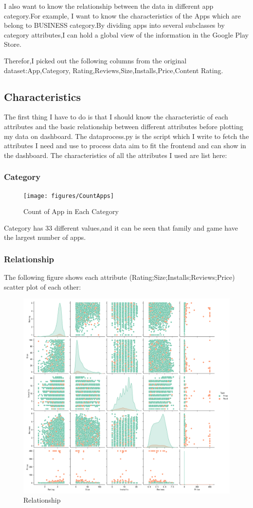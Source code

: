 \documentclass{hci}
\begin{document}
I also want to know the relationship between the data in different app category.For example, I want to know the
characteristics of the Apps which are belong to BUSINESS category.By dividing apps into several subclasses by category attributes,I can hold a global view of the information in the Google Play Store.

Therefor,I picked out the following columns from the original dataset:App,Category,
Rating,Reviews,Size,Installs,Price,Content Rating.

\subsection{Characteristics}
The first thing I have to do is that I should know the characteristic of each attributes and the basic relationship
between different attributes before plotting my data on dashboard.
The dataprocess.py is the script which I write to fetch the attributes I need and use to process data aim to fit the frontend and can show in the dashboard. 
The characteristics of all the attributes I used are list here:
\subsubsection{Category}
\begin{figure}[htbp]
	\centering
	\texttt{[image: figures/CountApps]}
	\caption{Count of App in Each Category}
	\label{fig:Count}
\end{figure}
Category has 33 different values,and it can be seen that family and game have the largest number of apps.

\subsubsection{Relationship}
The following figure shows each attribute (Rating;Size;Installs;Reviews;Price) scatter plot of each other:
\begin{figure}[htbp]
	\centering
	\includegraphics[width=0.8\linewidth]{figures/relation}
	\caption{Relationship}
	\label{fig:Relationship Between}
\end{figure}
\end{document}
